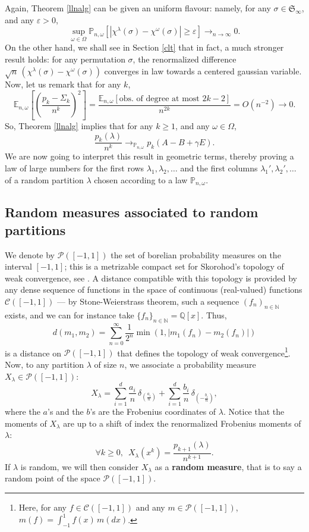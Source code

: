 \documentclass[smallextended,nospthms]{svjour3}
\theoremstyle{remark}
\newcommand{\N}{\mathbb{N}}
\newcommand{\Q}{\mathbb{Q}}
\newcommand{\sym}{\mathfrak{S}}
\newcommand{\proba}{\mathbb{P}}
\newcommand{\esper}{\mathbb{E}}
\newcommand{\eps}{\varepsilon}
\begin{document}
Again, Theorem \ref{llnalg} can be given an uniform flavour: namely, for any $\sigma \in \sym_{\infty}$, and any $\eps >0$,
$$\sup_{\omega \in \Omega} \proba_{n,\omega}[|\chi^{\lambda}(\sigma)-\chi^{\omega}(\sigma)|\geq \eps] \to_{n \to \infty} 0.$$
On the other hand, we shall see in Section \ref{clt} that in fact, a much stronger result holds: for any permutation $\sigma$, the renormalized difference $\sqrt{n}\,(\chi^{\lambda}(\sigma)-\chi^{\omega}(\sigma))$ converges in law towards a centered gaussian variable. Now, let us remark that for any $k$,
$$\esper_{n,\omega}\!\left[\left(\frac{p_{k}-\varSigma_{k}}{n^{k}}\right)^{2}\right]=\frac{\esper_{n,\omega}[\text{obs. of degree at most }2k-2]}{n^{2k}}=O(n^{-2}) \to 0.$$
So, Theorem \ref{llnalg} implies that for any $k\geq 1$, and any $\omega \in \Omega$,
$$\frac{p_{k}(\lambda)}{n^{k}} \longrightarrow_{\proba_{n,\omega}} p_{k}(A-B+\gamma E).$$
We are now going to interpret this result in geometric terms, thereby proving a law of large numbers for the first rows $\lambda_{1},\lambda_{2},\ldots$ and the first columns $\lambda_{1}',\lambda_{2}',\ldots$ of a random partition $\lambda$ chosen according to a law $\proba_{n,\omega}$.

\subsection{Random measures associated to random partitions}
We denote by $\mathscr{P}([-1,1])$ the set of borelian probability measures on the interval $[-1,1]$; this is a metrizable compact set for Skorohod's topology of weak convergence, see \cite[Chapter 1]{Bil69}. A distance compatible with this topology is provided by any dense sequence of functions in the space of continuous (real-valued) functions $\mathscr{C}([-1,1])$ --- by Stone-Weierstrass theorem, such a sequence $(f_{n})_{n \in \N}$ exists, and we can for instance take $\{f_{n}\}_{n \in \N}=\Q[x]$. Thus, 
$$d(m_{1},m_{2})=\sum_{n=0}^{\infty}\frac{1}{2^{n}} \min(1,|m_{1}(f_{n})-m_{2}(f_{n})|)$$
is a distance on $\mathscr{P}([-1,1])$ that defines the topology of weak convergence\footnote{Here, for any $f \in \mathscr{C}([-1,1])$ and any $m \in \mathscr{P}([-1,1])$, $m(f)=\int_{-1}^{1} f(x) \,m(dx)$.}. Now, to any partition $\lambda$ of size $n$, we associate a probability measure $X_{\lambda} \in \mathscr{P}([-1,1])$:
$$X_{\lambda}=\sum_{i=1}^{d} \frac{a_{i}}{n}\,\delta_{\left(\frac{a_{i}}{n}\right)}+\sum_{i=1}^{d} \frac{b_{i}}{n}\,\delta_{\left(-\frac{b_{i}}{n}\right)},$$
where the $a$'s and the $b$'s are the Frobenius coordinates of $\lambda$. Notice that the moments of $X_{\lambda}$ are up to a shift of index the renormalized Frobenius moments of $\lambda$:
$$\forall k \geq 0,\,\,\,X_{\lambda}(x^{k})=\frac{p_{k+1}(\lambda)}{n^{k+1}}.$$
If $\lambda$ is random, we will then consider $X_{\lambda}$ as a \textbf{random measure}, that is to say a random point of the space $\mathscr{P}([-1,1])$.\bigskip
\bigskip
\end{document}
